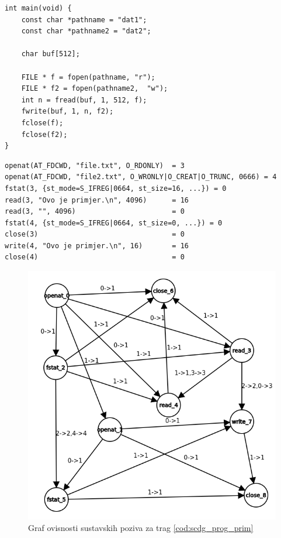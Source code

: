 \begin{lstlisting}[caption={Tekst programa za programski jezik C koji prvih 512 okteta jedne datoteke upisuje u drugu},label={cod:scdg_prog_prim}]
int main(void) {
    const char *pathname = "dat1";
    const char *pathname2 = "dat2";

    char buf[512];

    FILE * f = fopen(pathname, "r");
    FILE * f2 = fopen(pathname2,  "w");
    int n = fread(buf, 1, 512, f);
    fwrite(buf, 1, n, f2);
    fclose(f);
    fclose(f2);
}
\end{lstlisting}

\begin{lstlisting}[caption={Dio traga sustavskih poziva dobiven programom \inlinecode|strace|},label={cod:trag_scdg_prog_prim}]
openat(AT_FDCWD, "file.txt", O_RDONLY)  = 3
openat(AT_FDCWD, "file2.txt", O_WRONLY|O_CREAT|O_TRUNC, 0666) = 4
fstat(3, {st_mode=S_IFREG|0664, st_size=16, ...}) = 0
read(3, "Ovo je primjer.\n", 4096)      = 16
read(3, "", 4096)                       = 0
fstat(4, {st_mode=S_IFREG|0664, st_size=0, ...}) = 0
close(3)                                = 0
write(4, "Ovo je primjer.\n", 16)       = 16
close(4)                                = 0
\end{lstlisting}

\begin{figure}[htb]
    \centering
    \includegraphics[scale=0.5]{images/scdg_graf.png}
    \caption{Graf ovisnosti sustavskih poziva za trag \ref{cod:scdg_prog_prim}}
    \label{fig:scdg_graf_1}
\end{figure}

